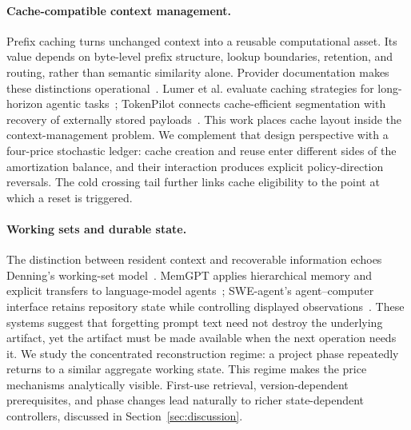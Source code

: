 \documentclass[sigconf,screen,nonacm]{acmart}
\begin{document}
\paragraph{Cache-compatible context management.}
Prefix caching turns unchanged context into a reusable computational asset.
Its value depends on byte-level prefix structure, lookup boundaries, retention,
and routing, rather than semantic similarity alone. Provider documentation
makes these distinctions operational~\cite{openaicache,anthropiccache,qwencache,
  deepseekcache}. Lumer et al. evaluate caching strategies for long-horizon
agentic tasks~\cite{dontbreak}; TokenPilot connects cache-efficient segmentation
with recovery of externally stored payloads~\cite{tokenpilot}. This work places
cache layout inside the context-management problem. We complement that design
perspective with a four-price stochastic ledger: cache creation and reuse enter
different sides of the amortization balance, and their interaction produces
explicit policy-direction reversals. The cold crossing tail further links
cache eligibility to the point at which a reset is triggered.

\paragraph{Working sets and durable state.}
The distinction between resident context and recoverable information echoes
Denning's working-set model~\cite{denning}. MemGPT applies hierarchical memory
and explicit transfers to language-model agents~\cite{memgpt}; SWE-agent's
agent--computer interface retains repository state while controlling displayed
observations~\cite{sweagent}. These systems suggest that forgetting prompt text
need not destroy the underlying artifact, yet the artifact must be made
available when the next operation needs it. We study the concentrated
reconstruction regime: a project phase repeatedly returns to a similar
aggregate working state. This regime makes the price mechanisms analytically
visible. First-use retrieval, version-dependent prerequisites, and phase changes
lead naturally to richer state-dependent controllers, discussed in
Section~\ref{sec:discussion}.
\end{document}
